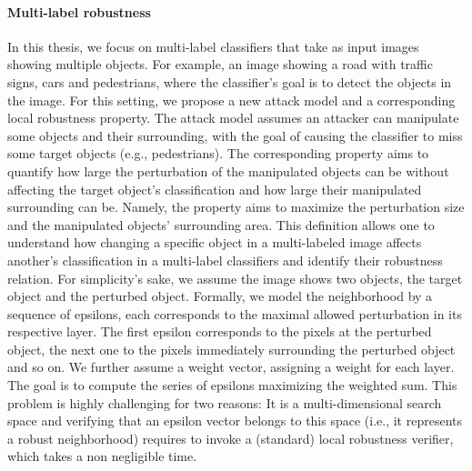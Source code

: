 \paragraph{Multi-label robustness}
In this thesis, we focus on multi-label classifiers that take as input images showing multiple objects. For example, an image showing a road with traffic signs, cars and pedestrians, where the classifier's goal is to detect the objects in the image.
For this setting, we propose a new attack model and a corresponding local robustness property. The attack model assumes an attacker can manipulate some objects and their surrounding, with the goal of causing the classifier to miss some target objects (e.g., pedestrians).
 The corresponding property aims to quantify how large the perturbation of the manipulated objects can be without affecting the target object's classification and how large their manipulated surrounding can be.
  Namely, the property aims to maximize the perturbation size and the manipulated objects' surrounding area.
This definition allows one to understand how changing a specific object in a multi-labeled image affects another's classification in a multi-label classifiers and identify their robustness relation.
For simplicity's sake, we assume the image shows two objects, the target object and the perturbed object.
Formally, we model the neighborhood by a sequence of epsilons, each corresponds to the maximal allowed perturbation in its respective layer.
The first epsilon corresponds to the pixels at the perturbed object, the next one to the pixels immediately surrounding the perturbed object and so on. %
We further assume a weight vector, assigning a weight for each layer.
The goal is to compute the series of epsilons maximizing the weighted sum.
This problem is highly challenging for two reasons:
It is a multi-dimensional search space and verifying that an epsilon vector belongs to this space (i.e., it represents a robust neighborhood) requires to invoke a (standard) local robustness verifier, which takes a non negligible time.

